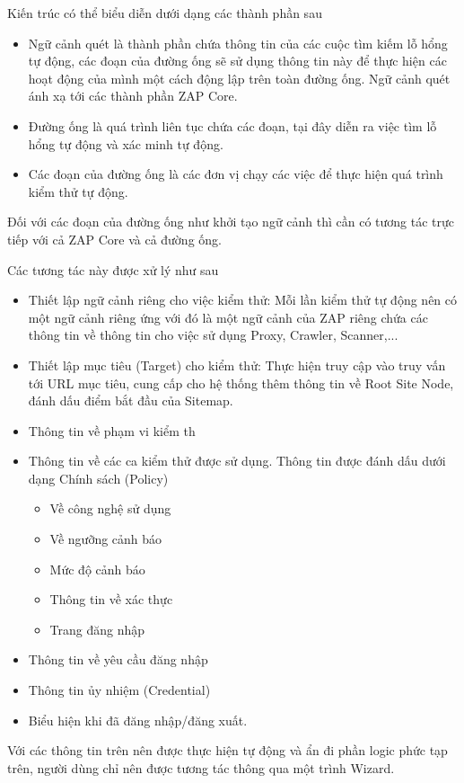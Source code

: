 \documentclass[./../main.tex]{subfiles}
\begin{document}
Kiến trúc có thể biểu diễn dưới dạng các thành phần sau
\begin{itemize}
	\item Ngữ cảnh quét là thành phần chứa thông tin của các cuộc tìm kiếm lỗ hổng tự động, các đoạn của đường ống sẽ sử dụng thông tin này để thực hiện các hoạt động của mình một cách động lập trên toàn đường ống. Ngữ cảnh quét ánh xạ tới các thành phần ZAP Core.
	\item Đường ống là quá trình liên tục chứa các đoạn, tại đây diễn ra việc tìm lỗ hổng tự động và xác minh tự động.
	\item Các đoạn của đường ống là các đơn vị chạy các việc để thực hiện quá trình kiểm thử tự động.
\end{itemize}
Đối với các đoạn của đường ống như khởi tạo ngữ cảnh thì cần có tương tác trực tiếp với cả ZAP Core và cả đường ống.

Các tương tác này được xử lý như sau
\begin{itemize}
	\item Thiết lập ngữ cảnh riêng cho việc kiểm thử: Mỗi lần kiểm thử tự động nên có một ngữ cảnh riêng ứng với đó là một ngữ cảnh của ZAP riêng chứa các thông tin về thông tin cho việc sử dụng Proxy, Crawler, Scanner,...
	\item Thiết lập mục tiêu (Target) cho kiểm thử: Thực hiện truy cập vào truy vấn tới URL mục tiêu, cung cấp cho hệ thống thêm thông tin về Root Site Node, đánh dấu điểm bắt đầu của Sitemap.
	\item Thông tin về phạm vi kiểm th
	\item Thông tin về các ca kiểm thử được sử dụng. Thông tin được đánh dấu dưới dạng Chính sách (Policy)
	      \begin{itemize}
		      \item Về công nghệ sử dụng
		      \item Về ngưỡng cảnh báo
		      \item Mức độ cảnh báo
		      \item Thông tin về xác thực
		      \item Trang đăng nhập
	      \end{itemize}
	\item Thông tin về yêu cầu đăng nhập
	\item Thông tin ủy nhiệm (Credential)
	\item Biểu hiện khi đã đăng nhập/đăng xuất.

\end{itemize}
Với các thông tin trên nên được thực hiện tự động và ẩn đi phần logic phức tạp trên, người dùng chỉ nên được tương tác thông qua một trình Wizard.
\end{document}
